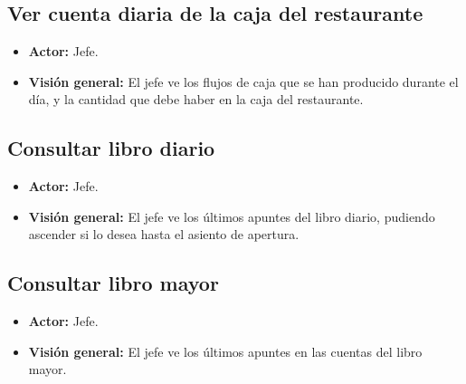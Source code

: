 \documentclass[spanish,a4paper,11pt, twoside]{report}	%
\begin{document}

	\subsection{Ver cuenta diaria de la caja del restaurante}
		\begin{itemize}
			\item \textbf{Actor:} Jefe.
			\item \textbf{Visión general:} El jefe ve los flujos de caja que se han producido durante el día, 
				y la cantidad que debe haber en la caja del restaurante.	
		\end {itemize}


	\subsection{Consultar libro diario}
		\begin{itemize}
			\item \textbf{Actor:} Jefe.
			\item \textbf{Visión general:} El jefe ve los últimos apuntes del libro diario, 
				pudiendo ascender si lo desea hasta el asiento de apertura.	
		\end {itemize}


	\subsection{Consultar libro mayor}
		\begin{itemize}
			\item \textbf{Actor:} Jefe.
			\item \textbf{Visión general:} El jefe ve los últimos apuntes en las cuentas del libro mayor. 
		\end {itemize}



\newpage
\mbox{}
\thispagestyle{empty}						%
\newpage
\end{document}
